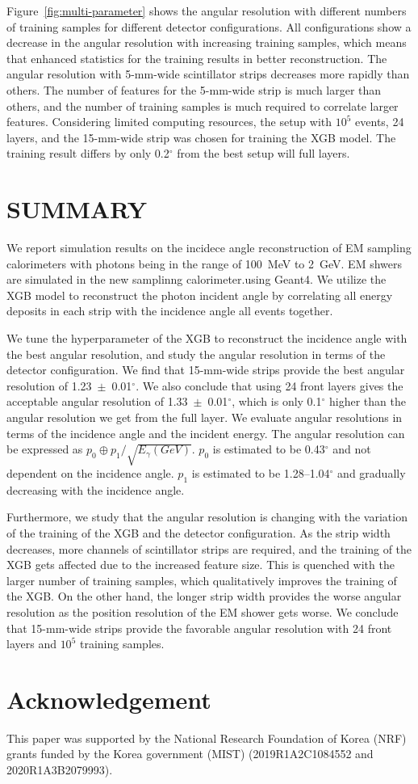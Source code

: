 \documentclass[preprint,12pt,times,a4paper]{elsarticle}
\begin{document}
Figure~\ref{fig:multi-parameter} shows the angular resolution with different numbers of training samples for different detector configurations. All configurations show a decrease in the angular resolution with increasing training samples, which means that enhanced statistics for the training results in better reconstruction. The angular resolution with 5-mm-wide scintillator strips decreases more rapidly than others. The number of features for the 5-mm-wide strip is much larger than others, and the number of training samples is much required to correlate larger features. Considering limited computing resources, the setup with $10^{5}$ events, 24 layers, and the 15-mm-wide strip was chosen for training the XGB model. The training result differs by only 0.2$^{\circ}$ from the best setup will full layers.
 
\section{SUMMARY}
\label{sec:sum}

We report simulation results on the incidece angle reconstruction of EM sampling calorimeters with photons being in the range of 100~MeV to 2~GeV. EM shwers are simulated in the new samplinng calorimeter.using Geant4. We utilize the XGB model to reconstruct the photon incident angle by correlating all energy deposits in each strip with the incidence angle all events together.

We tune the hyperparameter of the XGB to reconstruct the incidence angle with the best angular resolution, and study the angular resolution in terms of the detector configuration. We find that 15-mm-wide strips provide the best angular resolution of 1.23~$\pm$~0.01$^{\circ}$. We also conclude that using 24 front layers gives the acceptable angular resolution of 1.33~$\pm$~0.01$^{\circ}$, which is only 0.1$^{\circ}$ higher than the angular resolution we get from the full layer. We evaluate angular resolutions in terms of the incidence angle and the incident energy. The angular resolution can be expressed as $p_{0} \oplus p_{1}/\sqrt{E_{\gamma}(GeV)}$. $p_{0}$ is estimated to be 0.43$^{\circ}$ and not dependent on the incidence angle. $p_{1}$ is estimated to be 1.28--1.04$^{\circ}$ and gradually decreasing with the incidence angle.

Furthermore, we study that the angular resolution is changing with the variation of the training of the XGB and the detector configuration. As the strip width decreases, more channels of scintillator strips are required, and the training of the XGB gets affected due to the increased feature size. This is quenched with the larger number of training samples, which qualitatively improves the training of the XGB. On the other hand, the longer strip width provides the worse angular resolution as the position resolution of the EM shower gets worse. We conclude that 15-mm-wide strips provide the favorable angular resolution with 24 front layers and $10^{5}$ training samples.

\label{sec:con}


\section*{Acknowledgement}
This paper was supported by the National Research Foundation of Korea (NRF) grants funded by the Korea government (MIST) (2019R1A2C1084552 and \\ 2020R1A3B2079993).

\printbibliography
\end{document}
